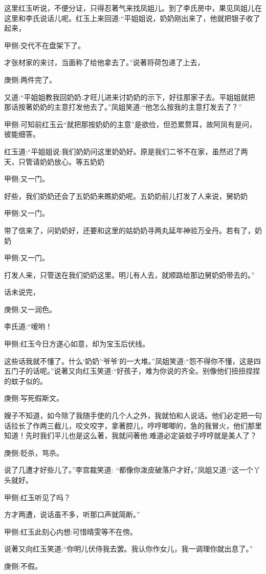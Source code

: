 \begin{parag}
    这里红玉听说，不便分证，只得忍著气来找凤姐儿。到了李氏房中，果见凤姐儿在这里和李氏说话儿呢。红玉上来回道:“平姐姐说，奶奶刚出来了，他就把银子收了起来，\begin{note}甲侧:交代不在盘架下了。\end{note}才张材家的来讨，当面称了给他拿去了。”说著将荷包递了上去，\begin{note}庚侧:两件完了。\end{note}又道:“平姐姐教我回奶奶:才旺儿进来讨奶奶的示下，好往那家子去。平姐姐就把那话按著奶奶的主意打发他去了。”凤姐笑道:“他怎么按我的主意打发去了？”\begin{note}甲侧:可知前红玉云“就把那按奶奶的主意”是欲俭，但恐累赘耳，故阿凤有是问，彼能细答。\end{note}红玉道:“平姐姐说:我们奶奶问这里奶奶好。原是我们二爷不在家，虽然迟了两天，只管请奶奶放心。等五奶奶\begin{note}甲侧:又一门。\end{note}好些，我们奶奶还会了五奶奶来瞧奶奶呢。五奶奶前儿打发了人来说，舅奶奶\begin{note}甲侧:又一门。\end{note}带了信来了，问奶奶好，还要和这里的姑奶奶寻两丸延年神验万全丹。若有了，奶奶\begin{note}甲侧:又一门。\end{note}打发人来，只管送在我们奶奶这里。明儿有人去，就顺路给那边舅奶奶带去的。”
\end{parag}


\begin{parag}
    话未说完，\begin{note}庚侧:又一润色。\end{note}李氏道:“嗳哟！\begin{note}甲侧:红玉今日方遂心如意，却为宝玉后伏线。\end{note}这些话我就不懂了。什么‘奶奶’‘爷爷’的一大堆。”凤姐笑道:“怨不得你不懂，这是四五门子的话呢。”说著又向红玉笑道:“好孩子，难为你说的齐全。别像他们扭扭捏捏的蚊子似的。\begin{note}庚侧:写死假斯文。\end{note}嫂子不知道，如今除了我随手使的几个人之外，我就怕和人说话。他们必定把一句话拉长了作两三截儿，咬文咬字，拿著腔儿，哼哼唧唧的，急的我冒火，他们那里知道！先时我们平儿也是这么著，我就问著他:难道必定装蚊子哼哼就是美人了？\begin{note}庚侧:贬杀，骂杀。\end{note}说了几遭才好些儿了。”李宫裁笑道: “都像你泼皮破落户才好。”凤姐又道:“这一个丫头就好。\begin{note}甲侧:红玉听见了吗？\end{note}方才两遭，说话虽不多，听那口声就简断。”\begin{note}甲侧:红玉此刻心内想:可惜晴雯等不在傍。\end{note}说著又向红玉笑道:“你明儿伏侍我去罢。我认你作女儿，我一调理你就出息了。”\begin{note}庚侧:不假。\end{note}
\end{parag}


